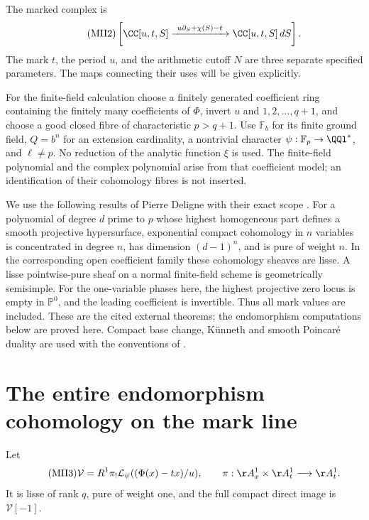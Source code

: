 The marked complex is
\begin{equation}\tag{MII2}\label{mii:mii:complex}
 \left[\CC[u,t,S]\xrightarrow{\ u\partial_S+\chi(S)-t\ }
                 \CC[u,t,S]\,dS\right].
\end{equation}
The mark $t$, the period $u$, and the arithmetic cutoff $N$ are three separate
specified parameters. The maps connecting their uses will be given explicitly.

For the finite-field calculation choose a finitely generated coefficient ring
containing the finitely many coefficients of $\Phi$, invert $u$ and
$1,2,\ldots,q+1$, and choose a good closed fibre of characteristic $p>q+1$.
Use $\mathbb F_b$ for its finite ground field, $Q=b^n$ for an extension
cardinality, a nontrivial character $\psi:\mathbb F_p\to\QQl^*$, and $\ell\ne p$.
No reduction of the analytic function $\xi$ is used. The finite-field
polynomial and the complex polynomial arise from that coefficient model; an
identification of their cohomology fibres is not inserted.

We use the following results of Pierre Deligne with their exact scope
\cite[\S3.7, (3.7.2.3), Lemma (3.7.3); (3.4.1)(iii)]{mii:deligne}.
For a polynomial of degree $d$ prime to $p$ whose highest homogeneous part
defines a smooth projective hypersurface, exponential compact cohomology in
$n$ variables is concentrated in degree $n$, has dimension $(d-1)^n$, and is
pure of weight $n$. In the corresponding open coefficient family these
cohomology sheaves are lisse. A lisse pointwise-pure sheaf on a normal
finite-field scheme is geometrically semisimple. For the one-variable phases
here, the highest projective zero locus is empty in $\mathbb P^0$, and the
leading coefficient is invertible. Thus all mark values are included. These
are the cited external theorems; the endomorphism computations below are
proved here. Compact base change, K\"unneth and smooth Poincar\'e duality are
used with the conventions of \cite[\S1.4]{mii:deligne}.

\section{The entire endomorphism cohomology on the mark line}
Let
\begin{equation}\tag{MII3}\label{mii:mii:V}
 \mathcal V=R^1\pi_!\mathcal L_\psi((\Phi(x)-tx)/u),
 \qquad\pi:\AA_x^1\times\AA_t^1\longrightarrow\AA_t^1.
\end{equation}
It is lisse of rank $q$, pure of weight one, and the full compact direct image
is $\mathcal V[-1]$.

